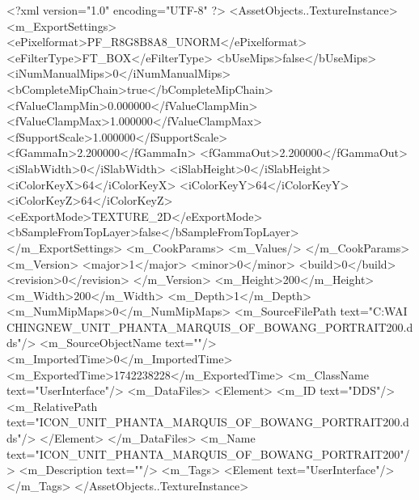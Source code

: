 <?xml version="1.0" encoding="UTF-8" ?>
<AssetObjects..TextureInstance>
	<m_ExportSettings>
		<ePixelformat>PF_R8G8B8A8_UNORM</ePixelformat>
		<eFilterType>FT_BOX</eFilterType>
		<bUseMips>false</bUseMips>
		<iNumManualMips>0</iNumManualMips>
		<bCompleteMipChain>true</bCompleteMipChain>
		<fValueClampMin>0.000000</fValueClampMin>
		<fValueClampMax>1.000000</fValueClampMax>
		<fSupportScale>1.000000</fSupportScale>
		<fGammaIn>2.200000</fGammaIn>
		<fGammaOut>2.200000</fGammaOut>
		<iSlabWidth>0</iSlabWidth>
		<iSlabHeight>0</iSlabHeight>
		<iColorKeyX>64</iColorKeyX>
		<iColorKeyY>64</iColorKeyY>
		<iColorKeyZ>64</iColorKeyZ>
		<eExportMode>TEXTURE_2D</eExportMode>
		<bSampleFromTopLayer>false</bSampleFromTopLayer>
	</m_ExportSettings>
	<m_CookParams>
		<m_Values/>
	</m_CookParams>
	<m_Version>
		<major>1</major>
		<minor>0</minor>
		<build>0</build>
		<revision>0</revision>
	</m_Version>
	<m_Height>200</m_Height>
	<m_Width>200</m_Width>
	<m_Depth>1</m_Depth>
	<m_NumMipMaps>0</m_NumMipMaps>
	<m_SourceFilePath text="C:\Users\YANG WAI CHING\Downloads\CIV\DDS NEW\ICON_UNIT_PHANTA_MARQUIS_OF_BOWANG_PORTRAIT200.dds"/>
	<m_SourceObjectName text=""/>
	<m_ImportedTime>0</m_ImportedTime>
	<m_ExportedTime>1742238228</m_ExportedTime>
	<m_ClassName text="UserInterface"/>
	<m_DataFiles>
		<Element>
			<m_ID text="DDS"/>
			<m_RelativePath text="ICON_UNIT_PHANTA_MARQUIS_OF_BOWANG_PORTRAIT200.dds"/>
		</Element>
	</m_DataFiles>
	<m_Name text="ICON_UNIT_PHANTA_MARQUIS_OF_BOWANG_PORTRAIT200"/>
	<m_Description text=""/>
	<m_Tags>
		<Element text="UserInterface"/>
	</m_Tags>
</AssetObjects..TextureInstance>

